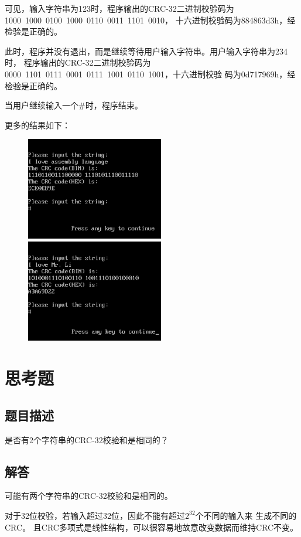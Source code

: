 \documentclass[UTF-8, a4paper, 12pt]{ctexart}
\begin{document}
可见，输入字符串为123时，程序输出的CRC-32二进制校验码为1000\ 1000\ 0100\ 1000\ 0110\ 0011\ 1101\ 0010，
十六进制校验码为884863d3h，经检验是正确的。

此时，程序并没有退出，而是继续等待用户输入字符串。用户输入字符串为234时，
程序输出的CRC-32二进制校验码为
0000\ 1101\ 0111\ 0001\ 0111\ 1001\ 0110\ 1001，十六进制校验
码为0d717969h，经检验是正确的。

当用户继续输入一个$\#$时，程序结束。
\newline

更多的结果如下：

\begin{figure}[htbp]
    \centering
    \includegraphics[width=6cm]{fig/f4.png}
    \includegraphics[width=6cm]{fig/f3.png}
\end{figure}


\section{思考题}
\subsection{题目描述}
是否有2个字符串的CRC-32校验和是相同的？
\subsection{解答}

可能有两个字符串的CRC-32校验和是相同的。

对于32位校验，若输入超过32位，因此不能有超过$2^{32}$个不同的输入来
生成不同的CRC。
且CRC多项式是线性结构，可以很容易地故意改变数据而维持CRC不变。
\end{document}
